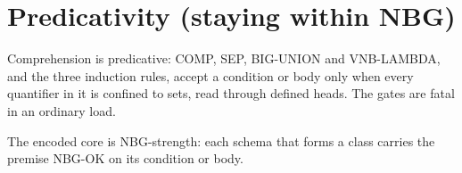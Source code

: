 \section*{Predicativity (staying within NBG)}
\begin{description}[style=nextline,leftmargin=1.4cm]
\item[DS-38]\label{ds:38} Comprehension is predicative: COMP, SEP, BIG-UNION and VNB-LAMBDA, and the three induction rules, accept a condition or body only when every quantifier in it is confined to sets, read through defined heads. The gates are fatal in an ordinary load.
\item[DS-39]\label{ds:39} The encoded core is NBG-strength: each schema that forms a class carries the premise NBG-OK on its condition or body.
\end{description}
